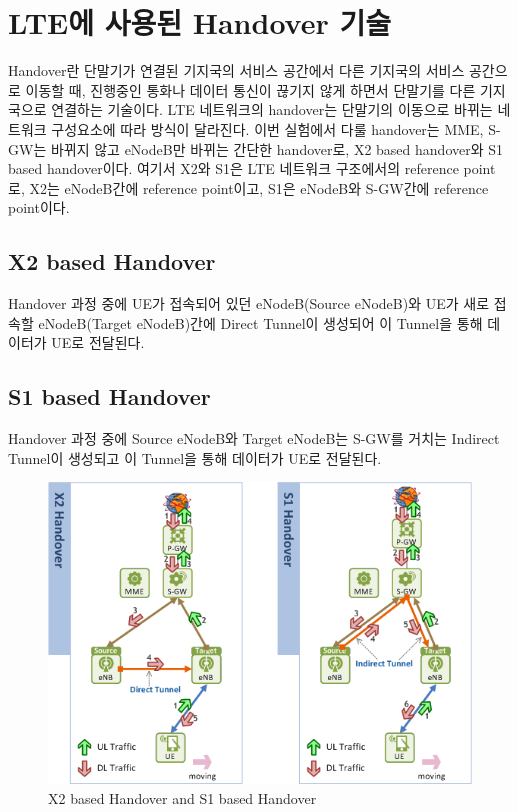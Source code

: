 \section{LTE에 사용된 Handover 기술}
Handover란 단말기가 연결된 기지국의 서비스 공간에서 다른 기지국의 서비스 공간으로 이동할 때, 진행중인 통화나 데이터 통신이 끊기지 않게 하면서 단말기를 다른 기지국으로 연결하는 기술이다. LTE 네트워크의 handover는 단말기의 이동으로 바뀌는 네트워크 구성요소에 따라 방식이 달라진다. 이번 실험에서 다룰 handover는 MME, S-GW는 바뀌지 않고 eNodeB만 바뀌는 간단한 handover로, X2 based handover와 S1 based handover이다. 여기서 X2와 S1은 LTE 네트워크 구조에서의 reference point로, X2는 eNodeB간에 reference point이고, S1은 eNodeB와 S-GW간에 reference point이다.
\subsection{X2 based Handover}
Handover 과정 중에 UE가 접속되어 있던 eNodeB(Source eNodeB)와 UE가 새로 접속할 eNodeB(Target eNodeB)간에 Direct Tunnel이 생성되어 이 Tunnel을 통해 데이터가 UE로 전달된다.
\subsection{S1 based Handover}
Handover 과정 중에 Source eNodeB와 Target eNodeB는 S-GW를 거치는 Indirect Tunnel이 생성되고 이 Tunnel을 통해 데이터가 UE로 전달된다.\\
\vspace{-4mm}  
\begin{figure}[!h]\centering
	\includegraphics[width=.7\textwidth]{image/week11/3-1.png}
	\caption{\small X2 based Handover and S1 based Handover}
	\vspace{-10pt}
\end{figure}